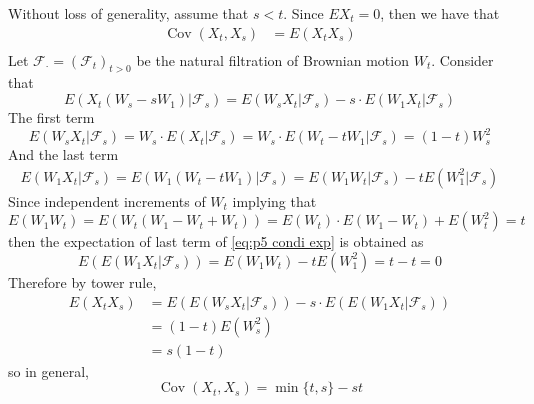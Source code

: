 \documentclass{homework}
\DeclareMathOperator{\cov}{Cov}
\begin{document}
    \problem
    \begin{subproblem}
        \item
        Without loss of generality, assume that $s<t$.
        Since $EX_t=0$, then we have that
        \[\begin{aligned}
            \cov(X_t,X_s)&=E(X_tX_s)\\
        \end{aligned}\]
        Let $\mathcal F_\cdot=(\mathcal F_t)_{t>0}$ be
        the natural filtration of Brownian motion
        $W_t$. Consider that
        \begin{equation}
            \label{eq:p5 condi exp}
            E(X_t(W_s-sW_1)|\mathcal F_s)
            =E(W_sX_t|\mathcal F_s)
            -s\cdot E(W_1X_t|\mathcal F_s)
        \end{equation}
        The first term
        \[E(W_sX_t|\mathcal F_s)=W_s\cdot E(X_t|\mathcal F_s)
        =W_s\cdot E(W_t-tW_1|\mathcal F_s)=(1-t)W_s^2\]
        And the last term
        \begin{equation*}
            \begin{aligned}
                E(W_1X_t|\mathcal F_s)
                =E(W_1(W_t-tW_1)|\mathcal F_s)
                =E(W_1W_t|\mathcal F_s)-tE(W_1^2|\mathcal F_s)
            \end{aligned}
        \end{equation*}
        Since independent increments of $W_t$ implying that
        \[E(W_1W_t)=E(W_t(W_1-W_t+W_t))=E(W_t)\cdot E(W_1-W_t)+E(W_t^2)=t\]
        then the expectation of last term of \cref{eq:p5 condi exp}
        is obtained as
        \[E(E(W_1X_t|\mathcal F_s))=E(W_1W_t)-tE(W_1^2)=t-t=0\]
        Therefore by tower rule,
        \[\begin{aligned}
            E(X_tX_s)&=E(E(W_sX_t|\mathcal F_s))-s\cdot E(E(W_1X_t|\mathcal F_s))\\
            &=(1-t)E(W_s^2)\\
            &=s(1-t)
        \end{aligned}\]
        so in general,
        \begin{equation}
            \label{eq:p5 cov}
            \cov(X_t,X_s)=\min\{t,s\}-st
        \end{equation}


\end{subproblem}
\end{document}
